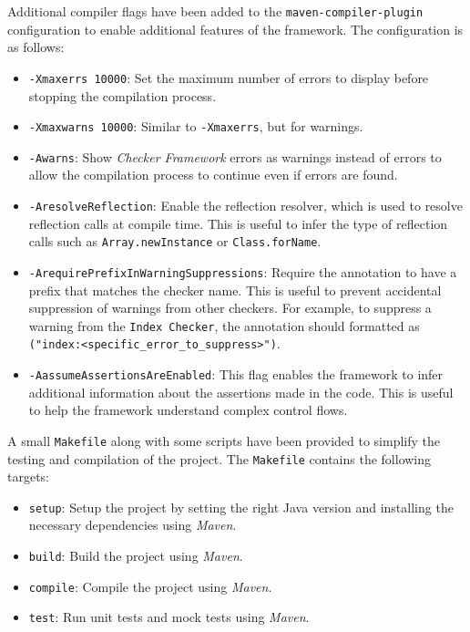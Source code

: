 \documentclass[a4paper, 11pt]{article}
\begin{document}
Additional compiler flags have been added to the \texttt{maven-compiler-plugin} configuration to enable additional features of the framework. The configuration is as follows:

\begin{itemize}
    \item \texttt{-Xmaxerrs 10000}: Set the maximum number of errors to display before stopping the compilation process.

    \item \texttt{-Xmaxwarns 10000}: Similar to \texttt{-Xmaxerrs}, but for warnings.

    \item \texttt{-Awarns}: Show \textit{Checker Framework} errors as warnings instead of errors to allow the compilation process to continue even if errors are found.

    \item \texttt{-AresolveReflection}: Enable the reflection resolver, which is used to resolve reflection calls at compile time. This is useful to infer the type of reflection calls such as \texttt{Array.newInstance} or \texttt{Class.forName}.

    \item \texttt{-ArequirePrefixInWarningSuppressions}: Require the \texttt{\@SuppressWarnings} annotation to have a prefix that matches the checker name. This is useful to prevent accidental suppression of warnings from other checkers. For example, to suppress a warning from the \texttt{Index Checker}, the annotation should formatted as \texttt{\@SuppressWarnings("index:<specific\_error\_to\_suppress>")}.

    \item \texttt{-AassumeAssertionsAreEnabled}: This flag enables the framework to infer additional information about the assertions made in the code. This is useful to help the framework understand complex control flows.
\end{itemize}

A small \texttt{Makefile} along with some scripts have been provided to simplify the testing and compilation of the project. The \texttt{Makefile} contains the following targets:

\begin{itemize}
    \item \texttt{setup}: Setup the project by setting the right Java version and installing the necessary dependencies using \textit{Maven}.

    \item \texttt{build}: Build the project using \textit{Maven}.

    \item \texttt{compile}: Compile the project using \textit{Maven}.

    \item \texttt{test}: Run unit tests and mock tests using \textit{Maven}.
\end{itemize}
\end{document}
